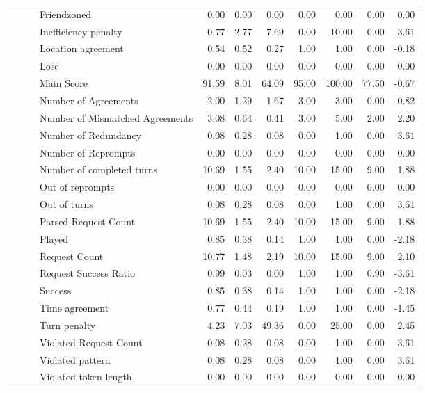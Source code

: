 \begin{tabular}{llllrrrrrrr}
 &  &  & Friendzoned & 0.00 & 0.00 & 0.00 & 0.00 & 0.00 & 0.00 & 0.00 \\
 &  &  & Inefficiency penalty & 0.77 & 2.77 & 7.69 & 0.00 & 10.00 & 0.00 & 3.61 \\
 &  &  & Location agreement & 0.54 & 0.52 & 0.27 & 1.00 & 1.00 & 0.00 & -0.18 \\
 &  &  & Lose & 0.00 & 0.00 & 0.00 & 0.00 & 0.00 & 0.00 & 0.00 \\
 &  &  & Main Score & 91.59 & 8.01 & 64.09 & 95.00 & 100.00 & 77.50 & -0.67 \\
 &  &  & Number of Agreements & 2.00 & 1.29 & 1.67 & 3.00 & 3.00 & 0.00 & -0.82 \\
 &  &  & Number of Mismatched Agreements & 3.08 & 0.64 & 0.41 & 3.00 & 5.00 & 2.00 & 2.20 \\
 &  &  & Number of Redundancy & 0.08 & 0.28 & 0.08 & 0.00 & 1.00 & 0.00 & 3.61 \\
 &  &  & Number of Reprompts & 0.00 & 0.00 & 0.00 & 0.00 & 0.00 & 0.00 & 0.00 \\
 &  &  & Number of completed turns & 10.69 & 1.55 & 2.40 & 10.00 & 15.00 & 9.00 & 1.88 \\
 &  &  & Out of reprompts & 0.00 & 0.00 & 0.00 & 0.00 & 0.00 & 0.00 & 0.00 \\
 &  &  & Out of turns & 0.08 & 0.28 & 0.08 & 0.00 & 1.00 & 0.00 & 3.61 \\
 &  &  & Parsed Request Count & 10.69 & 1.55 & 2.40 & 10.00 & 15.00 & 9.00 & 1.88 \\
 &  &  & Played & 0.85 & 0.38 & 0.14 & 1.00 & 1.00 & 0.00 & -2.18 \\
 &  &  & Request Count & 10.77 & 1.48 & 2.19 & 10.00 & 15.00 & 9.00 & 2.10 \\
 &  &  & Request Success Ratio & 0.99 & 0.03 & 0.00 & 1.00 & 1.00 & 0.90 & -3.61 \\
 &  &  & Success & 0.85 & 0.38 & 0.14 & 1.00 & 1.00 & 0.00 & -2.18 \\
 &  &  & Time agreement & 0.77 & 0.44 & 0.19 & 1.00 & 1.00 & 0.00 & -1.45 \\
 &  &  & Turn penalty & 4.23 & 7.03 & 49.36 & 0.00 & 25.00 & 0.00 & 2.45 \\
 &  &  & Violated Request Count & 0.08 & 0.28 & 0.08 & 0.00 & 1.00 & 0.00 & 3.61 \\
 &  &  & Violated pattern & 0.08 & 0.28 & 0.08 & 0.00 & 1.00 & 0.00 & 3.61 \\
 &  &  & Violated token length & 0.00 & 0.00 & 0.00 & 0.00 & 0.00 & 0.00 & 0.00 \\

\end{tabular}
